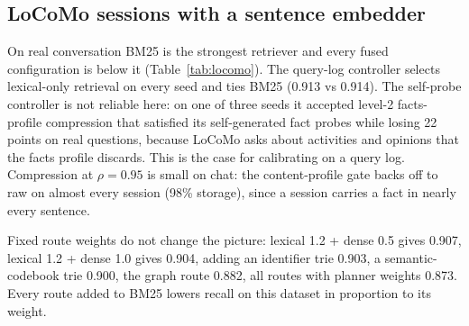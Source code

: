 \documentclass[conference]{IEEEtran}
\begin{document}
\subsection{LoCoMo sessions with a sentence embedder}
\label{sec:locomo}
On real conversation BM25 is the strongest retriever and every fused configuration is below it (Table~\ref{tab:locomo}). The query-log controller selects lexical-only retrieval on every seed and ties BM25 (0.913 vs 0.914). The self-probe controller is not reliable here: on one of three seeds it accepted level-2 facts-profile compression that satisfied its self-generated fact probes while losing 22 points on real questions, because LoCoMo asks about activities and opinions that the facts profile discards. This is the case for calibrating on a query log. Compression at $\rho = 0.95$ is small on chat: the content-profile gate backs off to raw on almost every session (98\% storage), since a session carries a fact in nearly every sentence.

Fixed route weights do not change the picture: lexical 1.2 + dense 0.5 gives 0.907, lexical 1.2 + dense 1.0 gives 0.904, adding an identifier trie 0.903, a semantic-codebook trie 0.900, the graph route 0.882, all routes with planner weights 0.873. Every route added to BM25 lowers recall on this dataset in proportion to its weight.

\begin{table}[t]
\caption{LoCoMo sessions, Recall@10, MiniLM-L6 embedder, 3 seeds ($\pm$ 95\% CI)}
\label{tab:locomo}
\centering
\scriptsize
{}
\end{table}
\end{document}
